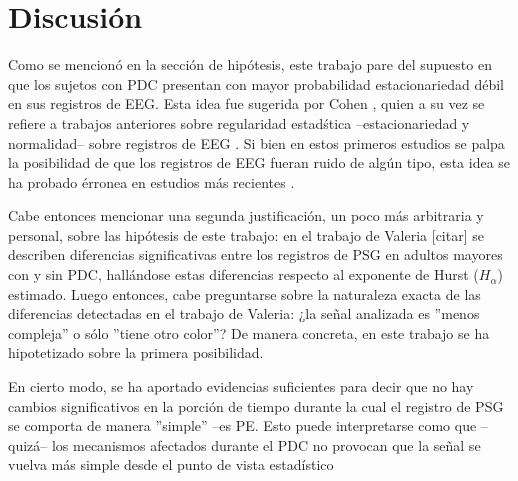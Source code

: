 \section{Discusi\'on}

Como se mencion\'o en la secci\'on de hip\'otesis, este trabajo pare del supuesto en que los
sujetos con PDC presentan con mayor probabilidad estacionariedad d\'ebil en sus registros de EEG.
Esta idea fue sugerida por Cohen \cite{Cohen77}, quien a su vez se refiere a trabajos anteriores
sobre regularidad estad\'stica --estacionariedad y normalidad-- sobre registros de 
EEG \cite{McEwen75,Sugimoto78,Kawabata73}. 
Si bien en estos primeros estudios se palpa la posibilidad de que los registros de EEG fueran
ruido de alg\'un tipo, esta idea se ha probado \'erronea en estudios m\'as recientes 
\cite{Klonowski09}.

Cabe entonces mencionar una segunda justificaci\'on, un poco m\'as arbitraria y personal, sobre
las hip\'otesis de este trabajo: en el trabajo de Valeria [citar] se describen
diferencias significativas entre los registros de PSG en adultos mayores con y sin PDC,
hall\'andose estas diferencias respecto
al exponente de Hurst ($H_\alpha$) estimado.
Luego entonces, cabe preguntarse sobre la naturaleza exacta de las diferencias detectadas en 
el trabajo de Valeria: ¿la se\~nal analizada es ''menos compleja'' o 
s\'olo ''tiene otro color''?
De manera concreta, en este trabajo se ha hipotetizado sobre la primera posibilidad.

En cierto modo, se ha aportado evidencias suficientes para decir que no hay cambios significativos
en la porci\'on de tiempo durante la cual el registro de PSG se comporta de manera ''simple''
--es PE. Esto puede interpretarse como que --quiz\'a-- los mecanismos afectados durante el PDC no 
provocan que la se\~nal se vuelva m\'as simple desde el punto de vista estad\'istico

